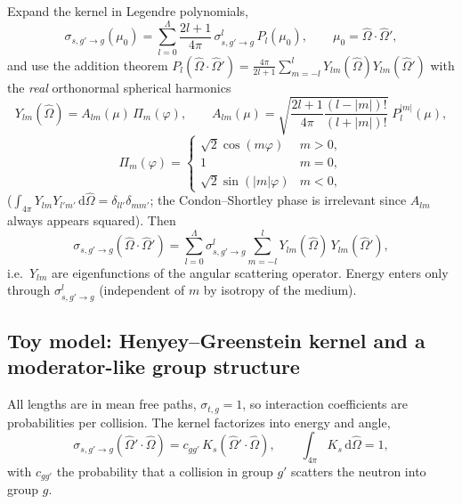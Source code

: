 \documentclass[11pt,a4paper]{article}
\numberwithin{equation}{section}
\theoremstyle{remark}
\newcommand{\Om}{\hat{\Omega}}
\newcommand{\dd}{\mathrm{d}}
\newcommand{\Lmax}{\Lambda}
\begin{document}
Expand the kernel in Legendre polynomials,
\begin{equation}
\sigma_{s,g'\to g}(\mu_0)=\sum_{l=0}^{\Lmax}\frac{2l+1}{4\pi}\,\sigma^{l}_{s,g'\to g}\,P_l(\mu_0),\qquad\mu_0=\Om\cdot\Om',
\end{equation}
and use the addition theorem $P_l(\Om\cdot\Om')=\frac{4\pi}{2l+1}\sum_{m=-l}^{l}Y_{lm}(\Om)Y_{lm}(\Om')$ with the \emph{real} orthonormal spherical harmonics
\begin{equation}
Y_{lm}(\Om)=A_{lm}(\mu)\,\Pi_m(\varphi),\qquad
A_{lm}(\mu)=\sqrt{\frac{2l+1}{4\pi}\frac{(l-|m|)!}{(l+|m|)!}}\;P_l^{|m|}(\mu),
\end{equation}
\begin{equation}
\Pi_m(\varphi)=\begin{cases}\sqrt2\cos(m\varphi) & m>0,\\ 1 & m=0,\\ \sqrt2\sin(|m|\varphi) & m<0,\end{cases}
\label{eq:Ylm}
\end{equation}
($\int_{4\pi}Y_{lm}Y_{l'm'}\,\dd\Om=\delta_{ll'}\delta_{mm'}$; the Condon--Shortley phase is irrelevant since $A_{lm}$ always appears squared). Then
\begin{equation}
\sigma_{s,g'\to g}(\Om\cdot\Om')=\sum_{l=0}^{\Lmax}\sigma^{l}_{s,g'\to g}\sum_{m=-l}^{l}Y_{lm}(\Om)\,Y_{lm}(\Om'),
\label{eq:kernel-Ylm}
\end{equation}
i.e.\ $Y_{lm}$ are eigenfunctions of the angular scattering operator. Energy enters only through $\sigma^{l}_{s,g'\to g}$ (independent of $m$ by isotropy of the medium).

\subsection{Toy model: Henyey--Greenstein kernel and a moderator-like group structure}
\label{sec:toy}

All lengths are in mean free paths, $\sigma_{t,g}=1$, so interaction coefficients are probabilities per collision. The kernel factorizes into energy and angle,
\begin{equation}
\sigma_{s,g'\to g}(\Om'\cdot\Om)=c_{gg'}\,K_s(\Om'\cdot\Om),\qquad \int_{4\pi}K_s\,\dd\Om=1,
\end{equation}
with $c_{gg'}$ the probability that a collision in group $g'$ scatters the neutron into group $g$.
\end{document}
